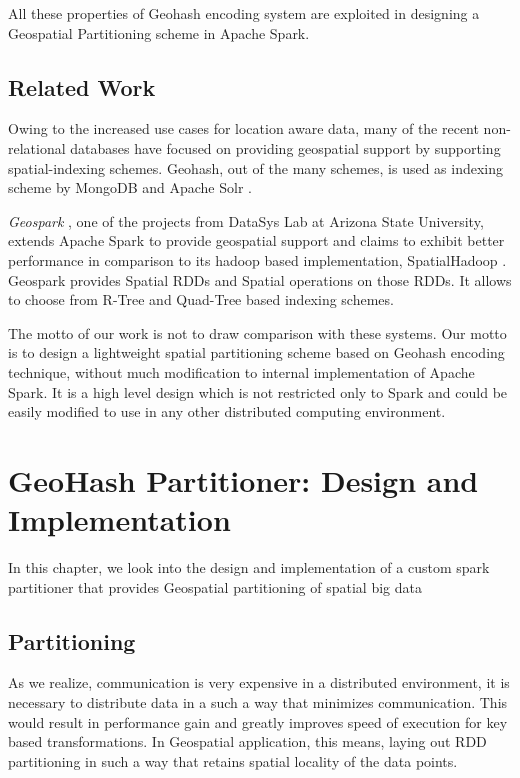 \documentclass[article,type=msc,colorback,12pt,accentcolor=tud1d]{tudthesis}
\begin{document}
		    All these properties of Geohash encoding system are exploited in designing a Geospatial Partitioning scheme in Apache Spark. 
		   
		   \clearpage
		   \subsection{Related Work} 
		   
		   Owing to the increased use cases for location aware data, many of the recent non-relational databases have focused on providing geospatial support by supporting spatial-indexing schemes. Geohash, out of the many schemes,  is used as indexing scheme by 
		   MongoDB \cite{MongoDB} and Apache Solr \cite{apachesolr}. 
		   
		   \textit{Geospark }\cite{geospark}, one of the projects from DataSys Lab at Arizona State University, extends Apache Spark to provide geospatial support and claims to exhibit better performance in comparison to its hadoop based implementation, SpatialHadoop \cite{spatialhadoop}. Geospark provides Spatial RDDs and Spatial operations on those RDDs. It allows to choose from R-Tree and Quad-Tree based indexing schemes. 
		   
		   The motto of our work is not to draw comparison with these systems. Our motto is to design a lightweight spatial partitioning scheme based on Geohash encoding technique, without much modification to internal implementation of Apache Spark. It is a high level design which is not restricted only to Spark and could be easily modified to use in any other distributed computing environment. 
		   
		  
     \cleardoublepage
     \hfill
	\section{GeoHash Partitioner: Design and Implementation}
		\hfill 
	
	In this chapter, we look into the design and implementation of a custom spark partitioner that provides  Geospatial partitioning of spatial big data
		\subsection{Partitioning}
			\par As we realize, communication is very expensive in a distributed environment, it is necessary to distribute data in a such a way that minimizes communication. This would result in performance gain and greatly improves speed of execution for key based transformations. In Geospatial application, this means, laying out RDD partitioning in such a way that retains spatial locality of the data points. 
			
\end{document}

